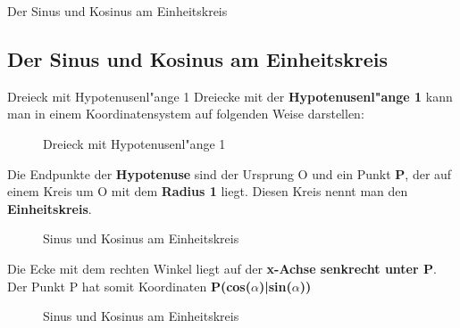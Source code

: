 \documentclass{standalone}
\begin{document}
\begin{frame}
  \begin{center}
    Der Sinus und Kosinus am Einheitskreis
  \end{center}
  \subsection{Der Sinus und Kosinus am Einheitskreis}
\end{frame}

\begin{frame}{Dreieck mit Hypotenusenl{"a}nge 1}
	Dreiecke mit der \textbf{Hypotenusenl{"a}nge 1} kann man in einem Koordinatensystem auf folgenden Weise darstellen:
	\begin{figure}[hb!]
		\centering
		\def\svgwidth{200px}
		
		\caption{Dreieck mit Hypotenusenl{"a}nge 1}
		\label{fig:rechtwinkliges_dreieck_sinus_def}
	\end{figure}
\end{frame}


\begin{frame}{1}
	Die Endpunkte der \textbf{Hypotenuse} sind der Ursprung O und ein Punkt \textbf{P}, der auf einem Kreis um O mit dem \textbf{Radius 1} liegt. Diesen Kreis nennt man den \textbf{Einheitskreis}.

	\begin{figure}[hb!]
		\centering
		\def\svgwidth{150px}
		
		\caption{Sinus und Kosinus am Einheitskreis}
		\label{fig:sin_cos_einheitskreis_1}
	\end{figure}
\end{frame}

\begin{frame}{2}
	Die Ecke mit dem rechten Winkel liegt auf der \textbf{x-Achse senkrecht unter P}. Der Punkt P hat somit Koordinaten \textbf{P(cos($\alpha$)|sin($\alpha$))}

	\begin{figure}[hb!]
		\centering
		\def\svgwidth{150px}
		
		\caption{Sinus und Kosinus am Einheitskreis}
		\label{fig:sin_cos_einheitskreis_2}
	\end{figure}
\end{frame}
\end{document}

